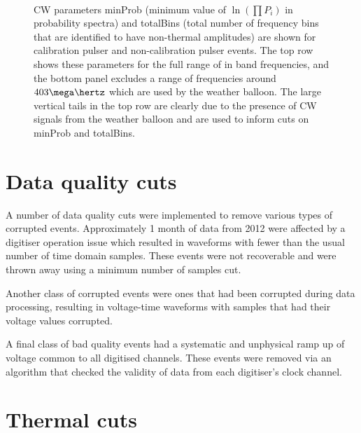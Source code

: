 \begin{figure}[htpb]
  \hfill
  \\
  \hfill
  \caption{CW parameters minProb (minimum value of $\ln(\prod P_{i})$ in probability spectra) and totalBins (total number of frequency bins that are identified to have non-thermal amplitudes) are shown for calibration pulser and non-calibration pulser events. The top row shows these parameters for the full range of in band frequencies, and the bottom panel excludes a range of frequencies around $403 \mega \hertz$ which are used by the weather balloon. The large vertical tails in the top row are clearly due to the presence of CW signals from the weather balloon and are used to inform cuts on minProb and totalBins.}
  \label{fig:analysis:CWRemoval:Filtering:CW-MinProb-TotalBins}
\end{figure}


\section{Data quality cuts}
\label{sec:Analysis:Data-Quality-Cuts}

A number of data quality cuts were implemented to remove various types of corrupted events. Approximately 1 month of data from 2012 were affected by a digitiser operation issue which resulted in waveforms with fewer than the usual number of time domain samples. These events were not recoverable and were thrown away using a minimum number of samples cut.

Another class of corrupted events were ones that had been corrupted during data processing, resulting in voltage-time waveforms with samples that had their voltage values corrupted.

A final class of bad quality events had a systematic and unphysical ramp up of voltage common to all digitised channels. These events were removed via an algorithm that checked the validity of data from each digitiser's clock channel.


\section{Thermal cuts}
\label{sec:Analysis:Thermal-Cuts}

